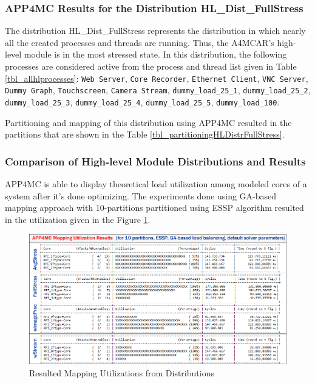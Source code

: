 \partitioningHLDistrAvgStress


\subsubsection{APP4MC Results for the Distribution HL{\_}Dist{\_}FullStress}

The distribution HL{\_}Dist{\_}FullStress represents the distribution in which nearly all the created processes and threads are running. Thus, the A4MCAR's high-level module is in the most stressed state. In this distribution, the following processes are considered active from the process and thread list given in Table \ref{tbl_allhlprocesses}: \texttt{Web Server}, \texttt{Core Recorder}, \texttt{Ethernet Client}, \texttt{VNC Server}, \texttt{Dummy Graph}, \texttt{Touchscreen}, \texttt{Camera Stream}, \texttt{dummy{\_}load{\_}25{\_}1}, \texttt{dummy{\_}load{\_}25{\_}2}, \texttt{dummy{\_}load{\_}25{\_}3}, \texttt{dummy{\_}load{\_}25{\_}4}, \texttt{dummy{\_}load{\_}25{\_}5}, \texttt{dummy{\_}load{\_}100}.

Partitioning and mapping of this distribution using APP4MC resulted in the partitions that are shown in the Table \ref{tbl_partitioningHLDistrFullStress}.

\partitioningHLDistrFullStress


\subsubsection{Comparison of High-level Module Distributions and Results}
APP4MC is able to display theoretical load utilization among modeled cores of a system after it's done optimizing. The experiments done using GA-based mapping approach with 10-partitions partitioned using ESSP algorithm resulted in the utilization given in the Figure \ref{fig:mappingutil}. 

\begin{figure}[!ht]
	\centering
	\includegraphics[width=\textwidth]{content/images/mappingutil.png}
	\caption{Resulted Mapping Utilizations from Distributions}
	\label{fig:mappingutil}
\end{figure}

